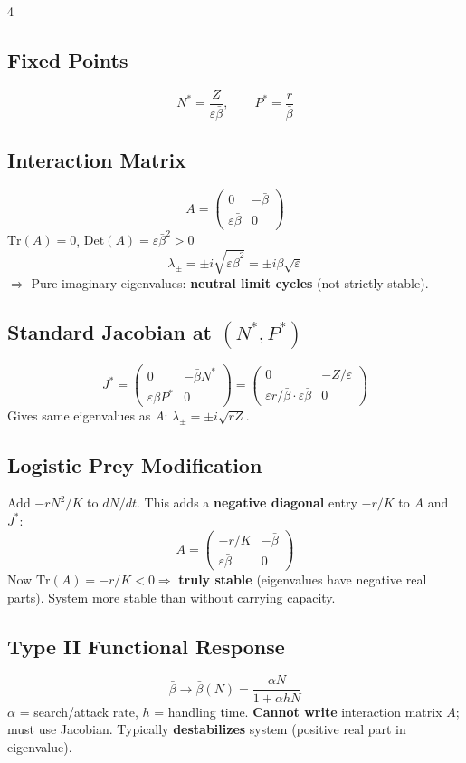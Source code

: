 \documentclass[8pt,landscape]{article}
\begin{document}
\begin{multicols}{4}
\subsection{Fixed Points}
\[
N^* = \frac{Z}{\varepsilon\bar{\beta}}, \qquad P^* = \frac{r}{\bar{\beta}}
\]

\subsection{Interaction Matrix}
\[
A = \begin{pmatrix} 0 & -\bar{\beta} \\ \varepsilon\bar{\beta} & 0 \end{pmatrix}
\]
$\text{Tr}(A) = 0$, $\text{Det}(A) = \varepsilon\bar{\beta}^2 > 0$
\[
\lambda_\pm = \pm i\sqrt{\varepsilon\bar{\beta}^2} = \pm i\bar{\beta}\sqrt{\varepsilon}
\]
$\Rightarrow$ Pure imaginary eigenvalues: \textbf{neutral limit cycles} (not strictly stable).

\subsection{Standard Jacobian at $(N^*, P^*)$}
\[
J^* = \begin{pmatrix} 0 & -\bar{\beta}N^* \\ \varepsilon\bar{\beta}P^* & 0 \end{pmatrix}
= \begin{pmatrix} 0 & -Z/\varepsilon \\ \varepsilon r/\bar{\beta}\cdot\varepsilon\bar{\beta} & 0 \end{pmatrix}
\]
Gives same eigenvalues as $A$: $\lambda_\pm = \pm i\sqrt{rZ}$.

\subsection{Logistic Prey Modification}
Add $-rN^2/K$ to $dN/dt$. This adds a \textbf{negative diagonal} entry $-r/K$ to $A$ and $J^*$:
\[
A = \begin{pmatrix} -r/K & -\bar{\beta} \\ \varepsilon\bar{\beta} & 0 \end{pmatrix}
\]
Now $\text{Tr}(A) = -r/K < 0 \Rightarrow$ \textbf{truly stable} (eigenvalues have negative real parts). System more stable than without carrying capacity.

\subsection{Type II Functional Response}
\[
\bar{\beta} \to \bar{\beta}(N) = \frac{\alpha N}{1 + \alpha h N}
\]
$\alpha$ = search/attack rate, $h$ = handling time. \textbf{Cannot write} interaction matrix $A$; must use Jacobian. Typically \textbf{destabilizes} system (positive real part in eigenvalue).


\end{multicols}
\end{document}
